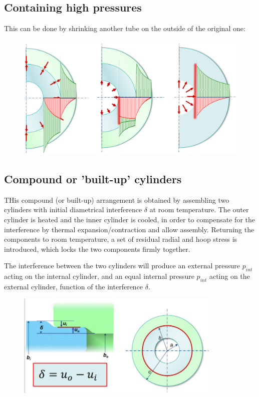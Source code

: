 \documentclass[class=report, crop=false, 12pt,a4paper]{standalone}
\begin{document}
\subsection{Containing high pressures}
This can be done by shrinking another tube on the outside of the original one:
\begin{figure}[H]
    \centering
    \includegraphics[width = \textwidth]{../img/diagram120.png}
    \caption{}
\end{figure}
\subsection{Compound or 'built-up' cylinders}
THis compound (or built-up) arrangement is obtained by assembling two cylinders with initial diametrical interference $\delta$ at room temperature. The outer cylinder is heated and the inner cylinder is cooled, in order to compensate for the interference by thermal expansion/contraction and allow assembly. Returning the components to room temperature, a set of residual radial and hoop stress is introduced, which locks the two components firmly together. 

The interference between the two cylinders will produce an external pressure $p_{int}$ acting on the internal cylinder, and an equal internal pressure $p_{int}$ acting on the external cylinder, function of the interference $\delta$. 

\begin{figure}[H]
    \centering
    \includegraphics[height = 5cm]{../img/diagram121.png}
    \caption{}
\end{figure}
\end{document}
